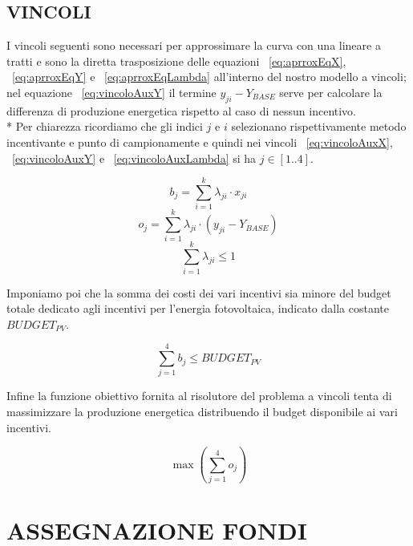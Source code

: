 \documentclass[12pt,a4paper,openright,twoside]{report}
\begin{document}
\subsection{VINCOLI}

I vincoli seguenti sono necessari per approssimare la curva con una lineare a tratti e sono la diretta trasposizione delle equazioni ~\ref{eq:aprroxEqX}, ~\ref{eq:aprroxEqY} e ~\ref{eq:aprroxEqLambda} all'interno del nostro modello a vincoli; nel equazione ~\ref{eq:vincoloAuxY} il termine $y_{ji}-Y_{BASE}$ serve per calcolare la differenza di produzione energetica rispetto al caso di nessun incentivo.\\*
Per chiarezza ricordiamo che gli indici $j$ e $i$ selezionano rispettivamente metodo incentivante e punto di campionamente e quindi nei vincoli ~\ref{eq:vincoloAuxX}, ~\ref{eq:vincoloAuxY} e ~\ref{eq:vincoloAuxLambda} si ha $j \in [1..4]$.

\begin{equation} \label{eq:vincoloAuxX}
	b_j = \sum_{i=1}^k \lambda_{ji} \cdot x_{ji} 
\end{equation}
\begin{equation} \label{eq:vincoloAuxY}
	o_j = \sum_{i=1}^k \lambda_{ji} \cdot (y_{ji}-Y_{BASE}) 
\end{equation}
\begin{equation} \label{eq:vincoloAuxLambda}
	\sum_{i=1}^k \lambda_{ji} \leq 1
\end{equation}

Imponiamo poi che la somma dei costi dei vari incentivi sia minore del budget totale dedicato agli incentivi per l'energia fotovoltaica, indicato dalla costante $BUDGET_{PV}$.

\begin{equation} \label{eq:vincoloCosti}
	\sum_{j=1}^4 b_j \leq BUDGET_{PV}
\end{equation}

Infine la funzione obiettivo fornita al risolutore del problema a vincoli tenta di massimizzare la produzione energetica distribuendo il budget disponibile ai vari incentivi.

\begin{equation} \label{eq:vincoloCosti}
	\max ( \sum_{j=1}^4 o_j )
\end{equation}



\section{ASSEGNAZIONE FONDI}
\end{document}
